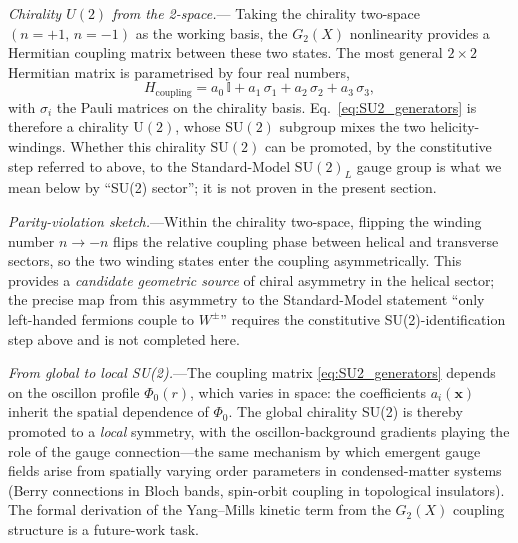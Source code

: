 \documentclass[11pt]{article}
\begin{document}
\textit{Chirality $U(2)$ from the 2-space.}---%
Taking the chirality two-space
$(n=+1,\,n=-1)$ as the working basis, the
$G_2(X)$ nonlinearity provides a Hermitian
coupling matrix between these two states.  The
most general $2\times 2$ Hermitian matrix is
parametrised by four real numbers,
\begin{equation}\label{eq:SU2_generators}
  H_{\mathrm{coupling}} = a_0\,\mathbb{I}
  + a_1\,\sigma_1 + a_2\,\sigma_2
  + a_3\,\sigma_3,
\end{equation}
with $\sigma_i$ the Pauli matrices on the
chirality basis.  Eq.~\eqref{eq:SU2_generators}
is therefore a chirality $\mathrm{U}(2)$, whose
$\mathrm{SU}(2)$ subgroup mixes the two
helicity-windings.  Whether this chirality
$\mathrm{SU}(2)$ can be promoted, by the
constitutive step referred to above, to the
Standard-Model $\mathrm{SU}(2)_L$ gauge group
is what we mean below by ``SU(2) sector''; it
is not proven in the present section.

\textit{Parity-violation sketch.}---Within the
chirality two-space, flipping the winding
number $n\to -n$ flips the relative coupling
phase between helical and transverse sectors,
so the two winding states enter the coupling
asymmetrically.  This provides a \emph{candidate
geometric source} of chiral asymmetry in the
helical sector; the precise map from this
asymmetry to the Standard-Model statement
``only left-handed fermions couple to $W^\pm$''
requires the constitutive SU(2)-identification
step above and is not completed here.

\textit{From global to local SU(2).}---The
coupling matrix \eqref{eq:SU2_generators}
depends on the oscillon profile $\Phi_0(r)$,
which varies in space: the coefficients
$a_i(\mathbf{x})$ inherit the spatial
dependence of $\Phi_0$.  The global chirality
SU(2) is thereby promoted to a \emph{local}
symmetry, with the oscillon-background
gradients playing the role of the gauge
connection---the same mechanism by which
emergent gauge fields arise from spatially
varying order parameters in condensed-matter
systems (Berry connections in Bloch bands,
spin-orbit coupling in topological
insulators).  The formal derivation of the
Yang--Mills kinetic term from the $G_2(X)$
coupling structure is a future-work task.
\end{document}
